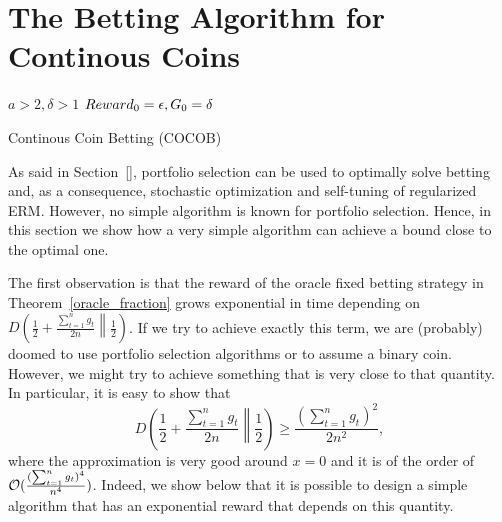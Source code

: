 \section{The Betting Algorithm for Continous Coins}
\label{sec:algo}

\begin{algorithm}[ht]
  \begin{algorithmic}
  {
     $a>2,\delta>1$
     $Reward_0=\epsilon,G_0=\delta$
    \ENDFOR
  }
  \end{algorithmic}
  \caption{Continous Coin Betting (COCOB)}
  \label{alg:cocob}
\end{algorithm}

As said in Section~\ref{}, portfolio selection can be used to optimally solve betting and, as a consequence, stochastic optimization and self-tuning of regularized \ac{ERM}. However, no simple algorithm is known for portfolio selection.
Hence, in this section we show how a very simple algorithm can achieve a bound close to the optimal one.

The first observation is that the reward of the oracle fixed betting strategy in Theorem~\ref{oracle_fraction} grows exponential in time depending on $D\left(\frac{1}{2}+\frac{\sum_{t=1}^n g_t}{2 n}\middle\|\frac{1}{2}\right)$. If we try to achieve exactly this term, we are (probably) doomed to use portfolio selection algorithms or to assume a binary coin.
However, we might try to achieve something that is very close to that quantity.
In particular, it is easy to show that
\[
D\left(\frac{1}{2}+\frac{\sum_{t=1}^n g_t}{2 n}\middle\|\frac{1}{2}\right) \geq \frac{(\sum_{t=1}^n g_t)^2}{2 n^2},
\]
where the approximation is very good around $x=0$ and it is of the order of $\mathcal{O}(\frac{(\sum_{t=1}^n g_t)^4}{ n^4})$. Indeed, we show below that it is possible to design a simple algorithm that has an exponential reward that depends on this quantity.

